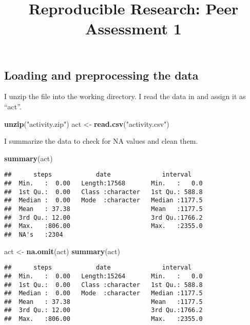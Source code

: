 \documentclass[
]{article}
\title{Reproducible Research: Peer Assessment 1}
\author{}
\date{\vspace{-2.5em}}
\newenvironment{Shaded}{\begin{snugshade}}{\end{snugshade}}
\newcommand{\KeywordTok}[1]{\textcolor[rgb]{0.13,0.29,0.53}{\textbf{#1}}}
\newcommand{\NormalTok}[1]{#1}
\newcommand{\StringTok}[1]{\textcolor[rgb]{0.31,0.60,0.02}{#1}}
\begin{document}
\maketitle

\hypertarget{loading-and-preprocessing-the-data}{%
\subsection{Loading and preprocessing the
data}\label{loading-and-preprocessing-the-data}}

I unzip the file into the working directory. I read the data in and
assign it as ``act''.

\begin{Shaded}
\begin{Highlighting}[]
 \KeywordTok{unzip}\NormalTok{(}\StringTok{"activity.zip"}\NormalTok{)}
\NormalTok{ act <-}\StringTok{ }\KeywordTok{read.csv}\NormalTok{(}\StringTok{"activity.csv"}\NormalTok{)}
\end{Highlighting}
\end{Shaded}

I summarize the data to check for NA values and clean them.

\begin{Shaded}
\begin{Highlighting}[]
\KeywordTok{summary}\NormalTok{(act)}
\end{Highlighting}
\end{Shaded}

\begin{verbatim}
##      steps            date              interval     
##  Min.   :  0.00   Length:17568       Min.   :   0.0  
##  1st Qu.:  0.00   Class :character   1st Qu.: 588.8  
##  Median :  0.00   Mode  :character   Median :1177.5  
##  Mean   : 37.38                      Mean   :1177.5  
##  3rd Qu.: 12.00                      3rd Qu.:1766.2  
##  Max.   :806.00                      Max.   :2355.0  
##  NA's   :2304
\end{verbatim}

\begin{Shaded}
\begin{Highlighting}[]
\NormalTok{act <-}\StringTok{ }\KeywordTok{na.omit}\NormalTok{(act)}
\KeywordTok{summary}\NormalTok{(act)}
\end{Highlighting}
\end{Shaded}

\begin{verbatim}
##      steps            date              interval     
##  Min.   :  0.00   Length:15264       Min.   :   0.0  
##  1st Qu.:  0.00   Class :character   1st Qu.: 588.8  
##  Median :  0.00   Mode  :character   Median :1177.5  
##  Mean   : 37.38                      Mean   :1177.5  
##  3rd Qu.: 12.00                      3rd Qu.:1766.2  
##  Max.   :806.00                      Max.   :2355.0
\end{verbatim}
\end{document}
